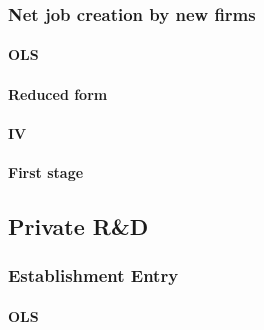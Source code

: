 \documentclass[7pt,english]{article}
\theoremstyle{remark}
\begin{document}
\newpage
\subsubsection{Net job creation by new firms}
\paragraph{OLS}
\begin{table}[h]
	
\end{table}

\newpage
\paragraph{Reduced form}
\begin{table}[h]
	
\end{table}

\paragraph{IV}
\begin{table}[h]
	
\end{table}

\paragraph{First stage}
\begin{table}[h]
	
\end{table}

\newpage
\subsection{Private R\&D}

\subsubsection{Establishment Entry}

\paragraph{OLS}
\begin{table}[h]
	
\end{table}

\newpage
\end{document}
